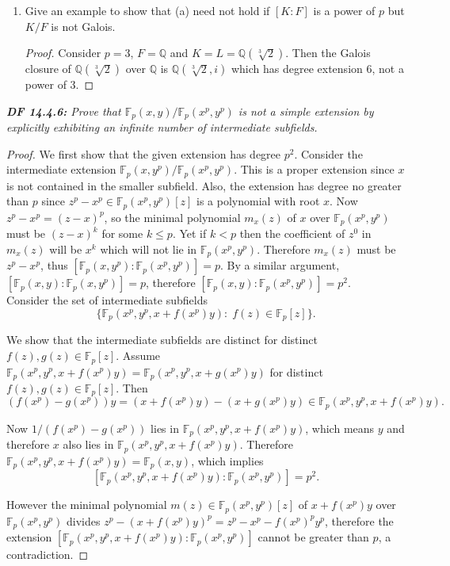 \documentclass{article}
\begin{document}
\begin{enumerate}[label={(\alph*)}]
    \item Give an example to show that (a) need not hold if $[K:F]$ is a
      power of $p$ but $K/F$ is not Galois.

      \begin{proof}
        Consider $p=3$, $F=\mathbb{Q}$ and $K=L=\mathbb{Q}(\sqrt[3]{2})$.
        Then the Galois closure of $\mathbb{Q}(\sqrt[3]{2})$ over
        $\mathbb{Q}$ is $\mathbb{Q}(\sqrt[3]{2},i)$ which has degree
        extension 6, not a power of 3.
      \end{proof}
  \end{enumerate}

\it \textbf{DF 14.4.6:} Prove that
  $\mathbb{F}_p(x,y)/\mathbb{F}_p(x^p,y^p)$ is not a simple extension by
  explicitly exhibiting an infinite number of intermediate subfields.

  \begin{proof}
    We first show that the given extension has degree $p^2$. Consider the
    intermediate extension $\mathbb{F}_p(x,y^p)/\mathbb{F}_p(x^p,y^p)$.
    This is a proper extension since $x$ is not contained in the smaller
    subfield. Also, the extension has degree no greater than $p$ since
    $z^p-x^p\in \mathbb{F}_p(x^p,y^p)[z]$ is a polynomial with root $x$.
    Now $z^p-x^p=(z-x)^p$, so the minimal polynomial $m_x(z)$ of $x$ over
    $\mathbb{F}_p(x^p,y^p)$ must be $(z-x)^k$ for some $k\leq p$. Yet if
    $k<p$ then the coefficient of $z^0$ in $m_x(z)$ will be $x^k$ which
    will not lie in $\mathbb{F}_p(x^p,y^p)$. Therefore $m_x(z)$ must be
    $z^p-x^p$, thus $[\mathbb{F}_p(x,y^p):\mathbb{F}_p(x^p,y^p)]=p$. By a
    similar argument, $[\mathbb{F}_p(x,y):\mathbb{F}_p(x,y^p)]=p$,
    therefore $[\mathbb{F}_p(x,y):\mathbb{F}_p(x^p,y^p)]=p^2$. \\

    Consider the set of intermediate subfields
    \[\{\mathbb{F}_p(x^p,y^p,x+f(x^p)y):\; f(z)\in\mathbb{F}_p[z]\}.\]

    We show that the intermediate subfields are distinct for distinct
    $f(z),g(z)\in\mathbb{F}_p[z]$. Assume $\mathbb{F}_p(x^p,y^p,x+f(x^p)y)
    =\mathbb{F}_p(x^p,y^p,x+g(x^p)y)$ for distinct
    $f(z),g(z)\in\mathbb{F}_p[z]$. Then
    \[(f(x^p)-g(x^p))y =(x+f(x^p)y) -(x+g(x^p)y)
    \in\mathbb{F}_p(x^p,y^p,x+f(x^p)y).\]

    Now $1/(f(x^p)-g(x^p))$ lies in $\mathbb{F}_p(x^p,y^p,x+f(x^p)y)$,
    which means $y$ and therefore $x$ also lies in
    $\mathbb{F}_p(x^p,y^p,x+f(x^p)y)$. Therefore
    $\mathbb{F}_p(x^p,y^p,x+f(x^p)y) =\mathbb{F}_p(x,y)$, which implies
    \[[\mathbb{F}_p(x^p,y^p,x+f(x^p)y): \mathbb{F}_p(x^p,y^p)] =p^2.\]

    However the minimal polynomial $m(z)\in \mathbb{F}_p(x^p,y^p)[z]$ of
    $x+f(x^p)y$ over $\mathbb{F}_p(x^p,y^p)$ divides $z^p-(x+f(x^p)y)^p
    =z^p-x^p-f(x^p)^py^p$, therefore the extension
    $[\mathbb{F}_p(x^p,y^p,x+f(x^p)y): \mathbb{F}_p(x^p,y^p)]$ cannot be
    greater than $p$, a contradiction.
  \end{proof}
\end{document}
